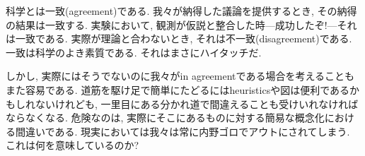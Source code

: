 科学とは一致(agreement)である. 我々が納得した議論を提供するとき, その納得の結果は一致する. 実験において, 観測が仮説と整合した時---成功したぞ!---それは一致である.  実際が理論と合わないとき, それは不一致(disagreement)である. 一致は科学のよき素質である. それはまさにハイタッチだ.

しかし, 実際にはそうでないのに我々がin agreementである場合を考えることもまた容易である. 道筋を駆け足で簡単にたどるにはheuristicsや図は便利であるかもしれないけれども, 一里目にある分かれ道で間違えることも受けいれなければならなくなる.
危険なのは, 実際にそこにあるものに対する簡易な概念化における間違いである. 現実においては我々は常に内野ゴロでアウトにされてしまう. これは何を意味しているのか?

